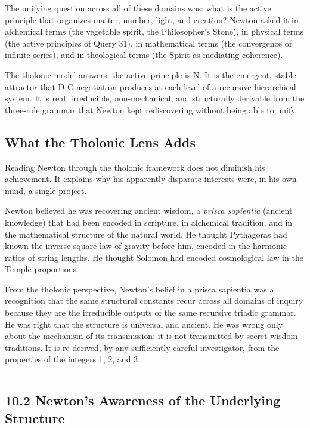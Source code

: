 \documentclass[12pt]{article}
\begin{document}
The unifying question across all of these domains was: what is the
active principle that organizes matter, number, light, and creation?
Newton asked it in alchemical terms (the vegetable spirit, the
Philosopher's Stone), in physical terms (the active principles of Query
31), in mathematical terms (the convergence of infinite series), and in
theological terms (the Spirit as mediating coherence).

The tholonic model answers: the active principle is N. It is the
emergent, stable attractor that D-C negotiation produces at each level
of a recursive hierarchical system. It is real, irreducible,
non-mechanical, and structurally derivable from the three-role grammar
that Newton kept rediscovering without being able to unify.

\subsection{What the Tholonic Lens Adds}\label{what-the-tholonic-lens-adds}

Reading Newton through the tholonic framework does not diminish his
achievement. It explains why his apparently disparate interests were, in
his own mind, a single project.

Newton believed he was recovering ancient wisdom, a \emph{prisca
sapientia} (ancient knowledge) that had been encoded in scripture, in
alchemical tradition, and in the mathematical structure of the natural
world. He thought Pythagoras had known the inverse-square law of gravity
before him, encoded in the harmonic ratios of string lengths. He thought
Solomon had encoded cosmological law in the Temple proportions.

From the tholonic perspective, Newton's belief in a prisca sapientia was
a recognition that the same structural constants recur across all
domains of inquiry because they are the irreducible outputs of the same
recursive triadic grammar. He was right that the structure is universal
and ancient. He was wrong only about the mechanism of its transmission:
it is not transmitted by secret wisdom traditions. It is re-derived, by
any sufficiently careful investigator, from the properties of the
integers 1, 2, and 3.

\begin{center}\rule{0.5\linewidth}{0.5pt}\end{center}

\subsection{10.2 Newton's Awareness of the Underlying
Structure}\label{newtons-awareness-of-the-underlying-structure}
\end{document}
